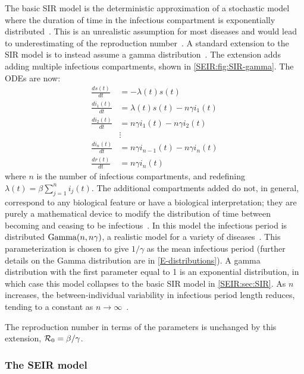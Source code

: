 \documentclass[thesis.tex]{subfiles}
\begin{document}
The basic SIR model is the deterministic approximation of a stochastic model where the duration of time in the infectious compartment is exponentially distributed~\autocite[96]{keelingModeling}.
This is an unrealistic assumption for most diseases and would lead to underestimating of the reproduction number~\autocite{lloydRealistic,wearingAppropriate}.
A standard extension to the SIR model is to instead assume a gamma distribution~\autocite[94]{keelingModeling,andersonSpread}.
The extension adds adding multiple infectious compartments, shown in \cref{SEIR:fig:SIR-gamma}.
The ODEs are now:
\begin{align}
\frac{ds(t)}{dt} &= -\lambda(t) s(t)\\
\frac{di_1(t)}{dt} &= \lambda(t) s(t) - n\gamma i_1(t) \\
\frac{di_2(t)}{dt} &= n\gamma i_1(t) - n \gamma i_2(t) \\
&\vdots \nonumber \\
\frac{di_n(t)}{dt} &= n\gamma i_{n-1}(t) - n \gamma i_n(t) \\
\frac{dr(t)}{dt} &= n\gamma i_n(t)
\end{align}
where $n$ is the number of infectious compartments, and redefining $\lambda(t) = \beta \sum_{j=1}^n i_j(t)$.
The additional compartments added do not, in general, correspond to any biological feature or have a biological interpretation; they are purely a mathematical device to modify the distribution of time between becoming and ceasing to be infectious~\autocite{lloydRealistic}.
In this model the infectious period is distributed $\operatorname{Gamma}(n, n\gamma)$, a realistic model for a variety of diseases~\autocite{wearingAppropriate}.
This parameterization is chosen to give $1/\gamma$ as the mean infectious period (further details on the Gamma distribution are in \cref{E-distributions}).
A gamma distribution with the first parameter equal to 1 is an exponential distribution, in which case this model collapses to the basic SIR model in \cref{SEIR:sec:SIR}.
As $n$ increases, the between-individual variability in infectious period length reduces, tending to a constant as $n \to \infty$~\autocite{lloydRealistic}.

The reproduction number in terms of the parameters is unchanged by this extension, \ie $\mathcal{R}_{0} = \beta / \gamma$.

\subsubsection{The SEIR model} \label{SEIR:sec:SEIR}
\end{document}

